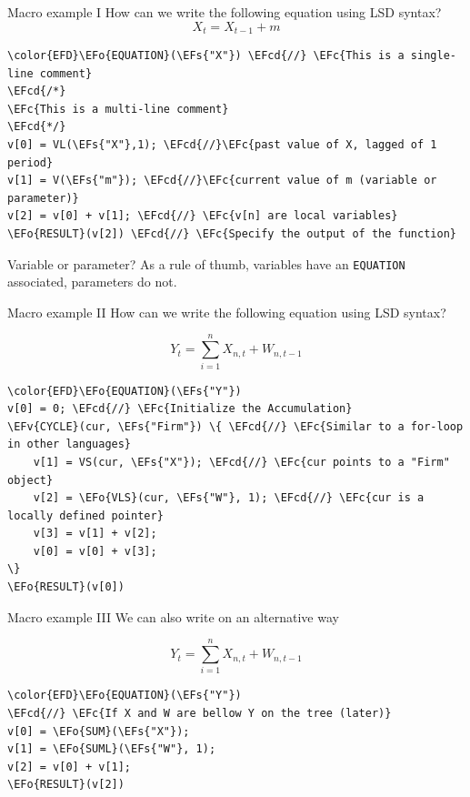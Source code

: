\documentclass[bigger,aspectratio=169]{beamer}
\newcommand{\EFc}[1]{\textcolor{EFc}{#1}} %
\newcommand{\EFcd}[1]{\textcolor{EFcd}{#1}} %
\newcommand{\EFs}[1]{\textcolor{EFs}{#1}} %
\newcommand{\EFv}[1]{\textcolor{EFv}{#1}} %
\newcommand{\EFo}[1]{\textcolor{EFo}{#1}} %
\begin{document}
\begin{frame}[label={sec:orgdb66af1},fragile]{Macro example I}
 How can we write the following equation using LSD syntax?
\[X_{t} = X_{t-1} + m\]
\begin{Code}
\begin{Verbatim}
\color{EFD}\EFo{EQUATION}(\EFs{"X"}) \EFcd{//} \EFc{This is a single-line comment}
\EFcd{/*}
\EFc{This is a multi-line comment}
\EFcd{*/}
v[0] = VL(\EFs{"X"},1); \EFcd{//}\EFc{past value of X, lagged of 1 period}
v[1] = V(\EFs{"m"}); \EFcd{//}\EFc{current value of m (variable or parameter)}
v[2] = v[0] + v[1]; \EFcd{//} \EFc{v[n] are local variables}
\EFo{RESULT}(v[2]) \EFcd{//} \EFc{Specify the output of the function}
\end{Verbatim}
\end{Code}
\begin{block}{Variable or parameter?}
As a rule of thumb, variables have an \texttt{EQUATION} associated, parameters do not.
\end{block}
\end{frame}
\begin{frame}[label={sec:orgb75681d},fragile]{Macro example II}
 How can we write the following equation using LSD syntax?

\[Y_{t} = \sum_{i=1}^{n} X_{n,t} + W_{n,t-1}\]



\begin{Code}
\begin{Verbatim}
\color{EFD}\EFo{EQUATION}(\EFs{"Y"})
v[0] = 0; \EFcd{//} \EFc{Initialize the Accumulation}
\EFv{CYCLE}(cur, \EFs{"Firm"}) \{ \EFcd{//} \EFc{Similar to a for-loop in other languages}
    v[1] = VS(cur, \EFs{"X"}); \EFcd{//} \EFc{cur points to a "Firm" object}
    v[2] = \EFo{VLS}(cur, \EFs{"W"}, 1); \EFcd{//} \EFc{cur is a locally defined pointer}
    v[3] = v[1] + v[2];
    v[0] = v[0] + v[3];
\}
\EFo{RESULT}(v[0])
\end{Verbatim}
\end{Code}
\end{frame}
\begin{frame}[label={sec:org68133e4},fragile]{Macro example III}
 We can also write on an alternative way

\[Y_{t} = \sum_{i=1}^{n} X_{n,t} + W_{n,t-1}\]



\begin{Code}
\begin{Verbatim}
\color{EFD}\EFo{EQUATION}(\EFs{"Y"})
\EFcd{//} \EFc{If X and W are bellow Y on the tree (later)}
v[0] = \EFo{SUM}(\EFs{"X"});
v[1] = \EFo{SUML}(\EFs{"W"}, 1);
v[2] = v[0] + v[1];
\EFo{RESULT}(v[2])
\end{Verbatim}
\end{Code}
\end{frame}
\end{document}
